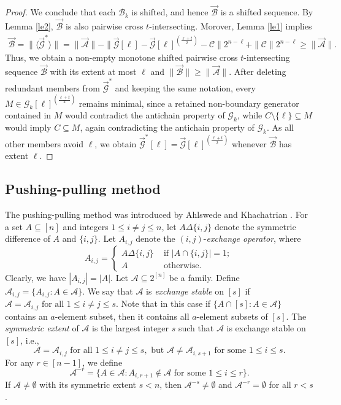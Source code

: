 \documentclass[11pt,a4paper]{article}
\begin{document}
\begin{proof}
We conclude that each $\mathcal B_k$ is shifted, and hence
$\vec{\mathcal B}$ is a shifted sequence.
By  Lemma \ref{le2}, $\vec{\mathcal{B}}$ is also pairwise cross $t$-intersecting. 
Morover, Lemma \ref{le1} implies
\begin{align*}
\vec{\mathcal{B}}=\|\langle \vec{\mathcal{G}}^*\rangle\| =\|\vec{\mathcal{A}}\|-\|\vec{\mathcal{G}}[\ell]-\vec{\mathcal{G}}[\ell]^{(\frac{\ell+t}{2})}- \mathcal C\|2^{n-\ell}+\|\mathcal C\|2^{n-\ell}\geq \|\vec{\mathcal{A}}\|.
\end{align*}
Thus, we  obtain a non-empty monotone shifted pairwise cross $t$-intersecting sequence $\vec{\mathcal{B}}$  with its extent at most $\ell$ and $\|\vec{\mathcal{B}}\|\geq \|\vec{\mathcal{A}}\|$. 
After deleting redundant members from $\vec{\mathcal G}^{*}$ and keeping the same notation, every $M\in\mathcal G_k[\ell]^{(\frac{\ell+t}{2})}$ remains minimal, since a retained non-boundary generator contained in $M$ would contradict the antichain property of $\mathcal G_k$, while $C\setminus\{\ell\}\subseteq M$ would imply $C\subseteq M$, again contradicting the antichain property of
$\mathcal G_k$. As all other members avoid $\ell$, we obtain $\vec{\mathcal{G}}^*[\ell]= \vec{\mathcal{G}}[\ell]^{(\frac{\ell+t}{2})}$ whenever $\vec{\mathcal B}$ has extent $\ell$.
\end{proof}










\subsection{Pushing-pulling method}
The pushing-pulling method was  introduced by  Ahlswede and Khachatrian \cite{AK1999}.
For a set $A \subseteq [n]$ and integers $1 \leq i\neq j \leq n$, 
let $A\Delta \{i,j\}$ denote the symmetric difference of $A$ and $ \{i,j\}$.
Let 
$A_{i,j}$ denote the $(i,j)$-\textit{exchange operator}, where
$$
A_{i,j}= \begin{cases}A\Delta \{i,j\} & \text { if } |A\cap \{i,j\}|=1; \\ A & \text { otherwise.}\end{cases}
$$ 
Clearly, we have $|A_{i,j}|=|A|$.
Let $\mathcal{A} \subseteq 2^{[n]}$ be a family. Define  $\mathcal{A}_{i,j}=\{A_{i,j}: A\in \mathcal{A}\}$. We say that $\mathcal{A}$ is \textit{exchange stable} on $[s]$ if $
\mathcal{A} = \mathcal{A}_{i,j} \text{ for all } 1 \leq i\neq j \leq s$.
Note that in this case if $\{A\cap [s]: A \in \mathcal{A}\}$ contains an $a$-element subset, then it contains all $a$-element subsets of $[s]$.
The \textit{symmetric extent} of $\mathcal{A}$ is the largest integer $s$ such that $\mathcal{A}$ is  exchange stable on $[s]$, i.e.,
$$
\mathcal{A} = \mathcal{A}_{i,j} \text{ for all } 1 \leq i\neq j \leq s, \text{ but } \mathcal{A} \neq \mathcal{A}_{i,s+1} \text{ for some } 1 \leq i \leq s.
$$
{ For any $r \in [n-1]$}, we define
$$
\mathcal{A}^{-r} = \{ A \in \mathcal{A}: A_{i,r+1} \notin \mathcal{A} \text{ for some } 1 \leq i \leq r \}.
$$
If $\mathcal{A}\neq \emptyset$ with its symmetric extent $s<n$,  then $\mathcal{A}^{-s}\neq \emptyset$ and $\mathcal{A}^{-r}=\emptyset$ for all $r<s$.
\end{document}
